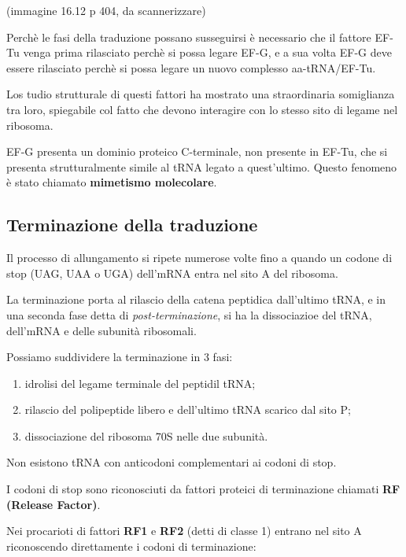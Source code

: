 \documentclass[11pt]{book}
\begin{document}
(immagine 16.12 p 404, da scannerizzare)

Perchè le fasi della traduzione possano susseguirsi è necessario che il
fattore EF-Tu venga prima rilasciato perchè si possa legare EF-G, e a
sua volta EF-G deve essere rilasciato perchè si possa legare un nuovo
complesso aa-tRNA/EF-Tu.

Los tudio strutturale di questi fattori ha mostrato una straordinaria
somiglianza tra loro, spiegabile col fatto che devono interagire con lo
stesso sito di legame nel ribosoma.

EF-G presenta un dominio proteico C-terminale, non presente in EF-Tu,
che si presenta strutturalmente simile al tRNA legato a quest'ultimo.
Questo fenomeno è stato chiamato \textbf{mimetismo molecolare}.

\subsection{Terminazione della
traduzione}\label{terminazione-della-traduzione}

Il processo di allungamento si ripete numerose volte fino a quando un
codone di stop (UAG, UAA o UGA) dell'mRNA entra nel sito A del ribosoma.

La terminazione porta al rilascio della catena peptidica dall'ultimo
tRNA, e in una seconda fase detta di \emph{post-terminazione}, si ha la
dissociazioe del tRNA, dell'mRNA e delle subunità ribosomali.

Possiamo suddividere la terminazione in 3 fasi:

\begin{enumerate}
\def\labelenumi{\arabic{enumi}.}
\itemsep1pt\parskip0pt
\item
  idrolisi del legame terminale del peptidil tRNA;
\item
  rilascio del polipeptide libero e dell'ultimo tRNA scarico dal sito P;
\item
  dissociazione del ribosoma 70S nelle due subunità.
\end{enumerate}

Non esistono tRNA con anticodoni complementari ai codoni di stop.

I codoni di stop sono riconosciuti da fattori proteici di terminazione
chiamati \textbf{RF (Release Factor)}.

Nei procarioti di fattori \textbf{RF1} e \textbf{RF2} (detti di classe
1) entrano nel sito A riconoscendo direttamente i codoni di
terminazione:
\end{document}

